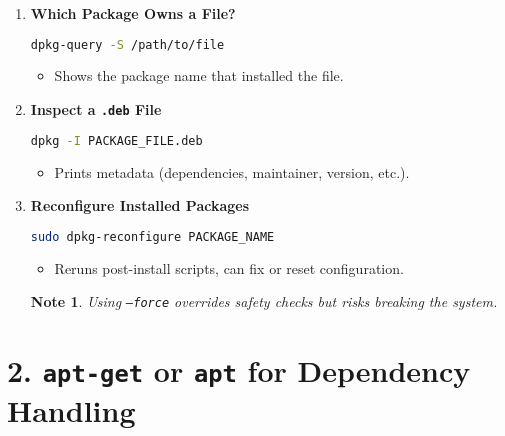 \documentclass[a4paper]{report}
\newtheorem*{noteenv}{Note}
\begin{document}
\begin{enumerate}
    \item \textbf{Which Package Owns a File?}
    \begin{lstlisting}[language=bash]
dpkg-query -S /path/to/file
    \end{lstlisting}
    \begin{itemize}
        \item Shows the package name that installed the file.
    \end{itemize}

    \item \textbf{Inspect a \texttt{.deb} File}
    \begin{lstlisting}[language=bash]
dpkg -I PACKAGE_FILE.deb
    \end{lstlisting}
    \begin{itemize}
        \item Prints metadata (dependencies, maintainer, version, etc.).
    \end{itemize}

    \item \textbf{Reconfigure Installed Packages}
    \begin{lstlisting}[language=bash]
sudo dpkg-reconfigure PACKAGE_NAME
    \end{lstlisting}
    \begin{itemize}
        \item Reruns post-install scripts, can fix or reset configuration.
    \end{itemize}

    \begin{noteenv}
        Using \texttt{--force} overrides safety checks but risks breaking the system.
    \end{noteenv}

\end{enumerate}

\section*{2. \texttt{apt-get} or \texttt{apt} for Dependency Handling}
\end{document}
